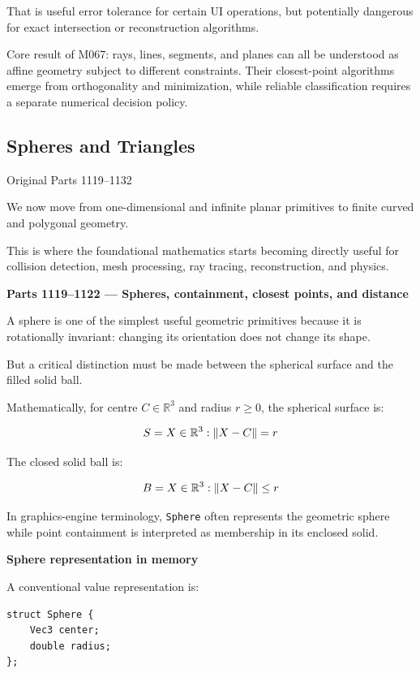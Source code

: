 That is useful error tolerance for certain UI operations, but potentially dangerous for exact intersection or reconstruction algorithms.

Core result of M067: rays, lines, segments, and planes can all be understood as affine geometry subject to different constraints. Their closest-point algorithms emerge from orthogonality and minimization, while reliable classification requires a separate numerical decision policy.

\subsection{Spheres and Triangles}\label{03-visual-computing-i-ch020-spheres-and-triangles}

Original Parts 1119--1132

We now move from one-dimensional and infinite planar primitives to finite curved and polygonal geometry.

This is where the foundational mathematics starts becoming directly useful for collision detection, mesh processing, ray tracing, reconstruction, and physics.

\textbf{Parts 1119--1122 --- Spheres, containment, closest points, and distance}

A sphere is one of the simplest useful geometric primitives because it is rotationally invariant: changing its orientation does not change its shape.

But a critical distinction must be made between the spherical surface and the filled solid ball.

Mathematically, for centre \(C\in\mathbb R^3\) and radius \(r\ge0\), the spherical surface is:

\[
S=\\{X\in\mathbb R^3:\|X-C\|=r\\}
\]

The closed solid ball is:

\[
B=\\{X\in\mathbb R^3:\|X-C\|\le r\\}
\]

In graphics-engine terminology, \texttt{Sphere} often represents the geometric sphere while point containment is interpreted as membership in its enclosed solid.

\textbf{Sphere representation in memory}

A conventional value representation is:

\begin{verbatim}
struct Sphere {
    Vec3 center;
    double radius;
};
\end{verbatim}

